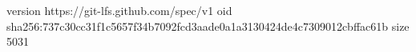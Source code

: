 version https://git-lfs.github.com/spec/v1
oid sha256:737c30cc31f1c5657f34b7092fcd3aade0a1a3130424de4c7309012cbffac61b
size 5031
